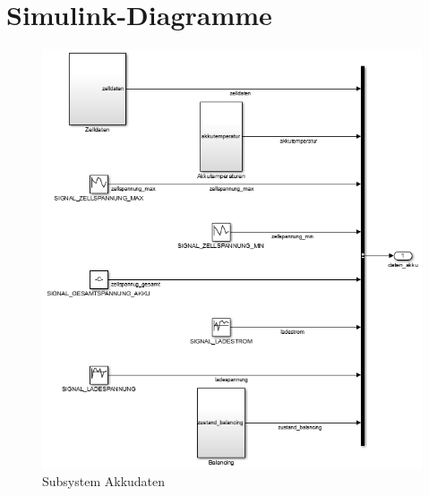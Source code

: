 \documentclass[fontsize = 12pt, paper = a4]{scrreprt}
\begin{document}

\listoffigures

%


\appendix
{} 

\section{Simulink-Diagramme}

\begin{figure}[b]
\centering
\includegraphics[scale = 0.8]{akkudaten}
\caption[Subsystem Akkudaten]{Subsystem Akkudaten}
\end{figure} 

\newpage
\end{document}
